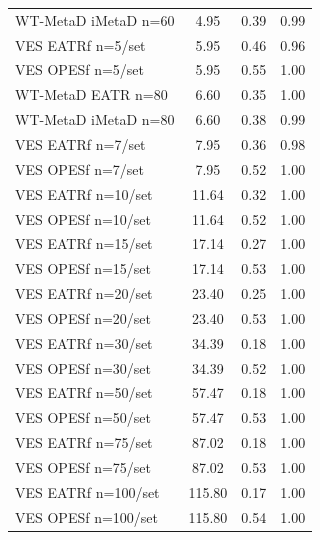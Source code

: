 \begin{longtable}{lccc}
WT-MetaD iMetaD n=60 & 4.95 & 0.39 & 0.99 \\
VES EATRf n=5/set & 5.95 & 0.46 & 0.96 \\
VES OPESf n=5/set & 5.95 & 0.55 & 1.00 \\
WT-MetaD EATR n=80 & 6.60 & 0.35 & 1.00 \\
WT-MetaD iMetaD n=80 & 6.60 & 0.38 & 0.99 \\
VES EATRf n=7/set & 7.95 & 0.36 & 0.98 \\
VES OPESf n=7/set & 7.95 & 0.52 & 1.00 \\
VES EATRf n=10/set & 11.64 & 0.32 & 1.00 \\
VES OPESf n=10/set & 11.64 & 0.52 & 1.00 \\
VES EATRf n=15/set & 17.14 & 0.27 & 1.00 \\
VES OPESf n=15/set & 17.14 & 0.53 & 1.00 \\
VES EATRf n=20/set & 23.40 & 0.25 & 1.00 \\
VES OPESf n=20/set & 23.40 & 0.53 & 1.00 \\
VES EATRf n=30/set & 34.39 & 0.18 & 1.00 \\
VES OPESf n=30/set & 34.39 & 0.52 & 1.00 \\
VES EATRf n=50/set & 57.47 & 0.18 & 1.00 \\
VES OPESf n=50/set & 57.47 & 0.53 & 1.00 \\
VES EATRf n=75/set & 87.02 & 0.18 & 1.00 \\
VES OPESf n=75/set & 87.02 & 0.53 & 1.00 \\
VES EATRf n=100/set & 115.80 & 0.17 & 1.00 \\
VES OPESf n=100/set & 115.80 & 0.54 & 1.00\\ \bottomrule
\end{longtable}
